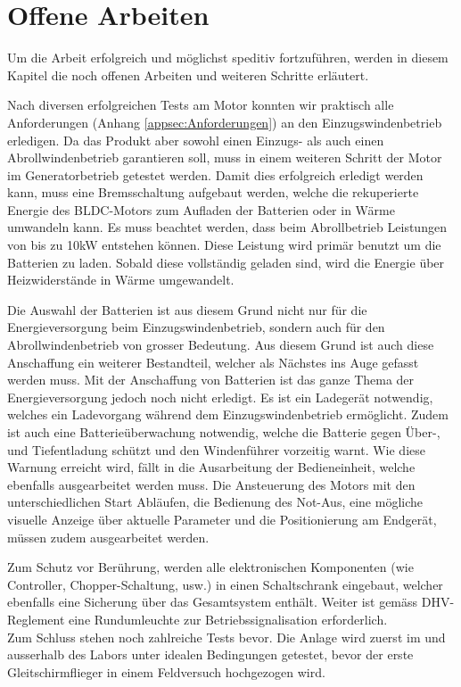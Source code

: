 \section{Offene Arbeiten}
Um die Arbeit erfolgreich und möglichst speditiv fortzuführen, werden in diesem Kapitel die noch offenen Arbeiten und weiteren Schritte erläutert.

Nach diversen erfolgreichen Tests am Motor konnten wir praktisch alle Anforderungen (Anhang \ref{appsec:Anforderungen}) an den Einzugswindenbetrieb erledigen. Da das Produkt aber sowohl einen Einzugs- als auch einen Abrollwindenbetrieb garantieren soll, muss in einem weiteren Schritt der Motor im Generatorbetrieb getestet werden. Damit dies erfolgreich erledigt werden kann, muss eine Bremsschaltung aufgebaut werden, welche die rekuperierte Energie des BLDC-Motors zum Aufladen der Batterien oder in Wärme umwandeln kann. Es muss beachtet werden, dass beim Abrollbetrieb Leistungen von bis zu 10kW entstehen können. Diese Leistung wird primär benutzt um die Batterien zu laden. Sobald diese vollständig geladen sind, wird die Energie über Heizwiderstände in Wärme umgewandelt.

Die Auswahl der Batterien ist aus diesem Grund nicht nur für die Energieversorgung beim Einzugswindenbetrieb, sondern auch für den Abrollwindenbetrieb von grosser Bedeutung. Aus diesem Grund ist auch diese Anschaffung ein weiterer Bestandteil, welcher als Nächstes ins Auge gefasst werden muss. Mit der Anschaffung von Batterien ist das ganze Thema der Energieversorgung jedoch noch nicht erledigt. Es ist ein Ladegerät notwendig, welches ein Ladevorgang während dem Einzugswindenbetrieb ermöglicht. Zudem ist auch eine Batterieüberwachung notwendig, welche die Batterie gegen Über-, und Tiefentladung schützt und den Windenführer vorzeitig warnt. Wie diese Warnung erreicht wird, fällt in die Ausarbeitung der Bedieneinheit, welche ebenfalls ausgearbeitet werden muss. Die Ansteuerung des Motors mit den unterschiedlichen Start Abläufen, die Bedienung des Not-Aus, eine mögliche visuelle Anzeige über aktuelle Parameter und die Positionierung am Endgerät, müssen zudem ausgearbeitet werden.

Zum Schutz vor Berührung, werden alle elektronischen Komponenten (wie Controller, Chopper-Schaltung, usw.) in einen Schaltschrank eingebaut, welcher ebenfalls eine Sicherung über das Gesamtsystem enthält.
Weiter ist gemäss DHV-Reglement eine Rundumleuchte zur Betriebssignalisation erforderlich.\\
Zum Schluss stehen noch zahlreiche Tests bevor. Die Anlage wird zuerst im und ausserhalb des Labors unter idealen Bedingungen getestet, bevor der erste Gleitschirmflieger in einem Feldversuch hochgezogen wird.